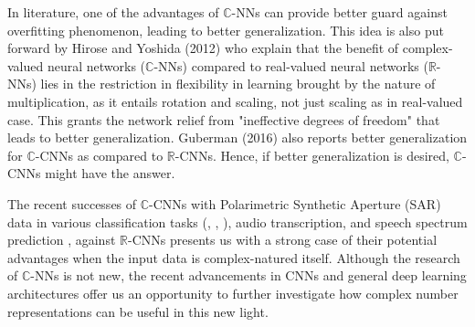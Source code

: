 In literature, one of the advantages of $\mathbb{C}$-NNs can provide better guard against overfitting phenomenon, leading to better generalization. This idea is also put forward by Hirose and Yoshida (2012) \cite{hirose2012complex} who explain that the benefit of complex-valued neural networks ($\mathbb{C}$-NNs) compared to real-valued neural networks ($\mathbb{R}$-NNs) lies in the restriction in flexibility in learning brought by the nature of multiplication, as it entails rotation and scaling, not just scaling as in real-valued case. This grants the network relief from "ineffective degrees of freedom" that leads to better generalization. Guberman (2016) \cite{Guberman} also reports better generalization for $\mathbb{C}$-CNNs as compared to $\mathbb{R}$-CNNs. Hence, if better generalization is desired, $\mathbb{C}$-CNNs might have the answer.

The recent successes of $\mathbb{C}$-CNNs with Polarimetric Synthetic Aperture (SAR) data in various classification tasks (\cite{polsarzhang2017complex}, \cite{hansch2010complex}, \cite{wilmanski2016complex}), audio transcription, and speech spectrum prediction \cite{trabelsi2018deep}, against $\mathbb{R}$-CNNs presents us with a strong case of their potential advantages when the input data is complex-natured itself. Although the research of $\mathbb{C}$-NNs is not new, the recent advancements in CNNs and general deep learning architectures offer us an opportunity to further investigate how complex number representations can be useful in this new light. 





